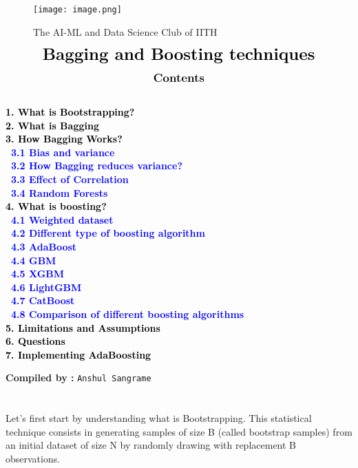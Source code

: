 \documentclass{homework}
\begin{document}
\begin{center}
\begin{figure}[h]
\centering
\texttt{[image: image.png]}
\caption*{{{\selectfont The AI-ML and Data Science Club of IITH}}}
\end{figure}
\end{center}
\begin{align*}
{\LARGE{\textbf{Bagging and Boosting techniques}}}
\end{align*}
\graphicspath{{./media/}}
\begin{align*}
\large{\textbf{{Contents}}}
\end{align*}
{\textcolor{black}{\textbf{
 \\
 1. {What is Bootstrapping?}\\
 2. {What is Bagging}\\
 3. {How Bagging Works?}\\
\indent \    \textcolor{blue}{3.1 Bias and variance}\\
\indent \    \textcolor{blue}{3.2 How Bagging reduces variance?}\\
\indent \    \textcolor{blue}{3.3 Effect of Correlation}\\
\indent \    \textcolor{blue}{3.4 Random Forests}\\
 4. {What is boosting?}\\
\indent \  \textcolor{blue}{4.1 Weighted dataset}\\
\indent \  \textcolor{blue}{4.2 Different type of boosting algorithm}\\
\indent \  \textcolor{blue}{4.3 AdaBoost}\\
\indent \  \textcolor{blue}{4.4 GBM}\\
\indent \  \textcolor{blue}{4.5 XGBM}\\
\indent \  \textcolor{blue}{4.6 LightGBM}\\
\indent \  \textcolor{blue}{4.7 CatBoost}\\
\indent \  \textcolor{blue}{4.8 Comparison of different boosting algorithms}\\
5. {Limitations and Assumptions}\\
6. {Questions}\\
7. {Implementing AdaBoosting}\\}}}
\begin{center}
    {\textbf{Compiled by :}
    \texttt{Anshul Sangrame}}
\end{center}

\newpage
\section{}
Let's first start by understanding what is Bootstrapping. This statistical technique consists in generating samples of size B (called bootstrap samples) from an initial dataset of size N by randomly drawing with replacement B observations.
\end{document}
